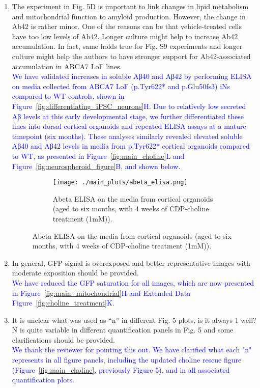 \begin{enumerate}
	\item The experiment in Fig. 5D is important to link changes in lipid metabolism and mitochondrial function to amyloid production. However, the change in Ab42 is rather minor. One of the reasons can be that vehicle-treated cells have too low levels of Ab42. Longer culture might help to increase Ab42 accumulation. In fact, same holds true for Fig. S9 experiments and longer culture might help the authors to have stronger support for Ab42-associated accumulation in ABCA7 LoF lines.\\
	\textcolor{blue}{We have validated increases in soluble Aβ40 and Aβ42 by performing ELISA on media collected from ABCA7 LoF (p.Tyr622* and p.Glu50fs3) iNs compared to WT controls, shown in Figure~\ref{fig:differentiating_iPSC_neurons}H. Due to relatively low secreted Aβ levels at this early developmental stage, we further differentiated these lines into dorsal cortical organoids and repeated ELISA assays at a mature timepoint (six months). These analyses similarly revealed elevated soluble Aβ40 and Aβ42 levels in media from p.Tyr622* cortical organoids compared to WT, as presented in Figure~\ref{fig:main_choline}L and Figure~\ref{fig:neurospheroid_figure}B, and shown below.}


	\begin{figure}[H] 
		\centering
		\begin{subfigure}[t]{.6\textwidth}
			\caption{Abeta ELISA on the media from cortical organoids (aged to six months, with 4 weeks of CDP-choline treatment (1mM)).}
			\texttt{[image: ./main\_plots/abeta\_elisa.png]}        
		\end{subfigure}  
	\end{figure}

	\item In general, GFP signal is overexposed and better representative images with moderate exposition should be provided.\\
	\textcolor{blue}{We have reduced the GFP saturation for all images, which are now presented in Figure~\ref{fig:main_mitochondrial}H and Extended Data Figure~\ref{fig:choline_treatment}K.} 

	\item It is unclear what was used as “n” in different Fig. 5 plots, is it always 1 well? N is quite variable in different quantification panels in Fig. 5 and some clarifications should be provided.\\
	\textcolor{blue}{We thank the reviewer for pointing this out. We have clarified what each "n" represents in all figure panels, including the updated choline rescue figure (Figure~\ref{fig:main_choline}, previously Figure 5), and in all associated quantification plots.}

\end{enumerate}

